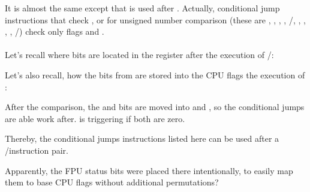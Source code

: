 



It is almost the same except that \JA is used after \SAHF. 
Actually, conditional jump instructions that check ,  or  for unsigned number comparison 
(these are \JA, \JAE, \JB, \JBE, \JE/\JZ, \JNA, \JNAE, \JNB, \JNBE, \JNE/\JNZ) check only flags \CF and \ZF.\\
\\
Let's recall where bits \CThreeBits are located in the  register after the execution of /\FNSTSW:



Let's also recall, how the bits from  are stored into the CPU flags the execution of \SAHF:



After the comparison, the \Cthree and \Czero bits are moved into \ZF and \CF, so the conditional jumps are able work after. \JA is triggering if both \CF are \ZF zero.

Thereby, the conditional jumps instructions listed here can be used after a \FNSTSW/\SAHF instruction pair.

Apparently, the FPU \CThreeBits status bits were placed there intentionally, to easily map them to base CPU flags without additional permutations?

